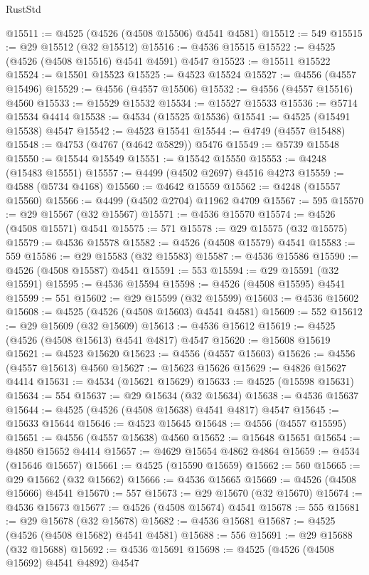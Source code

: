 \begin{lexlean}{RustStd}
\begin{coremodule}
@15511 := @4525 (@4526 (@4508 @15506) @4541 @4581)
@15512 := 549
@15515 := @29 @15512 (@32 @15512)
@15516 := @4536 @15515
@15522 := @4525 (@4526 (@4508 @15516) @4541 @4591) @4547
@15523 := @15511 @15522
@15524 := @15501 @15523
@15525 := @4523 @15524
@15527 := @4556 (@4557 @15496)
@15529 := @4556 (@4557 @15506)
@15532 := @4556 (@4557 @15516) @4560
@15533 := @15529 @15532
@15534 := @15527 @15533
@15536 := @5714 @15534 @4414
@15538 := @4534 (@15525 @15536)
@15541 := @4525 (@15491 @15538) @4547
@15542 := @4523 @15541
@15544 := @4749 (@4557 @15488)
@15548 := @4753 (@4767 (@4642 @5829)) @5476
@15549 := @5739 @15548
@15550 := @15544 @15549
@15551 := @15542 @15550
@15553 := @4248 (@15483 @15551)
@15557 := @4499 (@4502 @2697) @4516 @4273
@15559 := @4588 (@5734 @4168)
@15560 := @4642 @15559
@15562 := @4248 (@15557 @15560)
@15566 := @4499 (@4502 @2704) @11962 @4709
@15567 := 595
@15570 := @29 @15567 (@32 @15567)
@15571 := @4536 @15570
@15574 := @4526 (@4508 @15571) @4541
@15575 := 571
@15578 := @29 @15575 (@32 @15575)
@15579 := @4536 @15578
@15582 := @4526 (@4508 @15579) @4541
@15583 := 559
@15586 := @29 @15583 (@32 @15583)
@15587 := @4536 @15586
@15590 := @4526 (@4508 @15587) @4541
@15591 := 553
@15594 := @29 @15591 (@32 @15591)
@15595 := @4536 @15594
@15598 := @4526 (@4508 @15595) @4541
@15599 := 551
@15602 := @29 @15599 (@32 @15599)
@15603 := @4536 @15602
@15608 := @4525 (@4526 (@4508 @15603) @4541 @4581)
@15609 := 552
@15612 := @29 @15609 (@32 @15609)
@15613 := @4536 @15612
@15619 := @4525 (@4526 (@4508 @15613) @4541 @4817) @4547
@15620 := @15608 @15619
@15621 := @4523 @15620
@15623 := @4556 (@4557 @15603)
@15626 := @4556 (@4557 @15613) @4560
@15627 := @15623 @15626
@15629 := @4826 @15627 @4414
@15631 := @4534 (@15621 @15629)
@15633 := @4525 (@15598 @15631)
@15634 := 554
@15637 := @29 @15634 (@32 @15634)
@15638 := @4536 @15637
@15644 := @4525 (@4526 (@4508 @15638) @4541 @4817) @4547
@15645 := @15633 @15644
@15646 := @4523 @15645
@15648 := @4556 (@4557 @15595)
@15651 := @4556 (@4557 @15638) @4560
@15652 := @15648 @15651
@15654 := @4850 @15652 @4414
@15657 := @4629 @15654 @4862 @4864
@15659 := @4534 (@15646 @15657)
@15661 := @4525 (@15590 @15659)
@15662 := 560
@15665 := @29 @15662 (@32 @15662)
@15666 := @4536 @15665
@15669 := @4526 (@4508 @15666) @4541
@15670 := 557
@15673 := @29 @15670 (@32 @15670)
@15674 := @4536 @15673
@15677 := @4526 (@4508 @15674) @4541
@15678 := 555
@15681 := @29 @15678 (@32 @15678)
@15682 := @4536 @15681
@15687 := @4525 (@4526 (@4508 @15682) @4541 @4581)
@15688 := 556
@15691 := @29 @15688 (@32 @15688)
@15692 := @4536 @15691
@15698 := @4525 (@4526 (@4508 @15692) @4541 @4892) @4547

\end{coremodule}
\end{lexlean}

